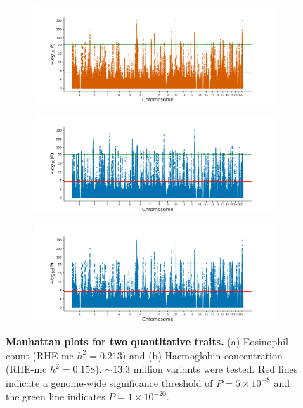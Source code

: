 \begin{figure}[h!]
\begin{subfigure}{.5\textwidth}
    \includegraphics[width=\textwidth]{figures/manhattan_quant/regenie_400k_Haemoglobin_concentration.regenie.png}
    \end{subfigure}
    \begin{subfigure}{.5\textwidth}
    \includegraphics[width=\textwidth]{figures/manhattan_quant/qd_Eosinophill_count.sumstats.gz.png}
    \caption{}
    \end{subfigure}%
    \begin{subfigure}{.5\textwidth}
    \includegraphics[width=\textwidth]{figures/manhattan_quant/qd_Haemoglobin_concentration.sumstats.gz.png}
    \caption{}
    \end{subfigure}
    \caption{\textbf{Manhattan plots for two quantitative traits.}
    (a) Eosinophil count (RHE-me $h^2 = 0.213$) and (b) Haemoglobin concentration (RHE-mc $h^2 = 0.158$).
    ${\sim}13.3$ million variants were tested.
    Red lines indicate a genome-wide significance threshold of $ P = 5 \times 10^{-8}$ and the green line indicates $P = 1 \times 10^{-20}$.
    }
    \label{fig:qd_man_quant1}
\end{figure}


